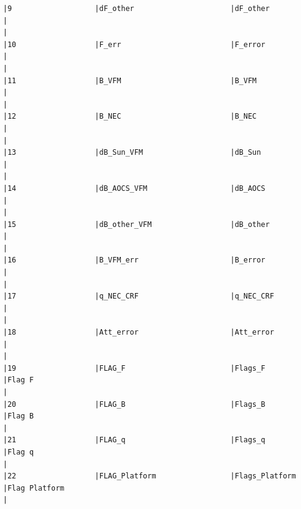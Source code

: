 \begin{verbatim}
|9                   |dF_other                      |dF_other                      |                                                                                                    |
|10                  |F_err                         |F_error                       |                                                                                                    |
|11                  |B_VFM                         |B_VFM                         |                                                                                                    |
|12                  |B_NEC                         |B_NEC                         |                                                                                                    |
|13                  |dB_Sun_VFM                    |dB_Sun                        |                                                                                                    |
|14                  |dB_AOCS_VFM                   |dB_AOCS                       |                                                                                                    |
|15                  |dB_other_VFM                  |dB_other                      |                                                                                                    |
|16                  |B_VFM_err                     |B_error                       |                                                                                                    |
|17                  |q_NEC_CRF                     |q_NEC_CRF                     |                                                                                                    |
|18                  |Att_error                     |Att_error                     |                                                                                                    |
|19                  |FLAG_F                        |Flags_F                       |Flag F                                                                                              |
|20                  |FLAG_B                        |Flags_B                       |Flag B                                                                                              |
|21                  |FLAG_q                        |Flags_q                       |Flag q                                                                                              |
|22                  |FLAG_Platform                 |Flags_Platform                |Flag Platform                                                                                       |

\end{verbatim}

